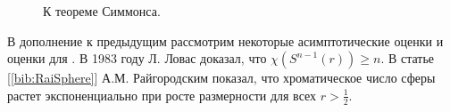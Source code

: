\begin{figure}[h]
\centering
\captionsetup{justification=centering}
\begin{minipage}[h]{0.5\linewidth}
\end{minipage}\hfill
\begin{minipage}[h]{0.5\linewidth}
\end{minipage}\hfill
\caption{К теореме Симмонса.}
\label{chapter1:fig:simmons}
\end{figure}

В дополнение к предыдущим рассмотрим некоторые асимптотические оценки и оценки для . В 1983 году  Л. Ловас доказал, что  $\chi(S^{n-1}(r)) \geq n$. В статье [\ref{bib:RaiSphere}] А.М. Райгородским показал, что хроматическое число сферы растет экспоненциально при росте размерности для всех $r > \frac{1}{2}$.

